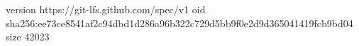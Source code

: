 version https://git-lfs.github.com/spec/v1
oid sha256:ee73ce8541af2c94dbd1d286a96b322c729d5bb9f0e2d9d365041419fcb9bd04
size 42023
